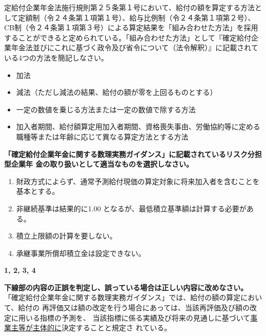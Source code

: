 \begin{shortanswer}[自作 2026/10/12]
  定給付企業年金法施行規則第２５条第１号において、給付の額を算定する方法として定額制（令２４条第１項第１号）、給与比例制（令２４条第１項第２号）、CB制（令２４条第１項第３号）による算定結果を「組み合わせた方法」を採用することができると定められている。「組み合わせた方法」として『確定給付企業年金法並びにこれに基づく政令及び省令について（法令解釈）』に記載されている4つの方法を簡記しなさい。
\end{shortanswer}

\begin{answerbox}
  \begin{itemize}
    \item 加法
    \item 減法（ただし減法の結果、給付の額が零を上回るものとする）
    \item 一定の数値を乗じる方法または一定の数値で除する方法
    \item 加入者期間、給付額算定用加入者期間、資格喪失事由、労働協約等に定める職種等または年齢に応じて異なる算定方法とする方法
  \end{itemize}
\end{answerbox}

\begin{truefalse}[年金2 2021 問題1(1)\textcircled{1}]
      \textbf{「確定給付企業年金に関する数理実務ガイダンス」に記載されているリスク分担型企業年
金の取り扱いとして適当なものを選択しなさい。}
  \\  

  \begin{enumerate}
    \item 財政方式によらず、通常予測給付現価の算定対象に将来加入者を含むことを基本とする。
    \item 非継続基準は結果的に1.00 となるが、最低積立基準額は計算する必要がある。
    \item 積立上限額の計算を要しない。
    \item 承継事業所償却積立金は設定できない。
  \end{enumerate}
\end{truefalse}

\begin{answerbox}
  \textbf{1, 2, 3, 4}
\end{answerbox}

\begin{truefalse}[年金2 2021 問題1(1)\textcircled{2}]
      \textbf{下線部の内容の正誤を判定し、誤っている場合は正しい内容に改めなさい。}
  \\  

  「確定給付企業年金に関する数理実務ガイダンス」では、給付の額の算定において、給付の
再評価又は額の改定を行う場合にあっては、当該再評価及び額の改定に用いる指標の予測を、
当該指標に係る実績及び将来の見通しに基づいて\underline{事業主等が主体的に}決定することと規定さ
れている。
\end{truefalse}

